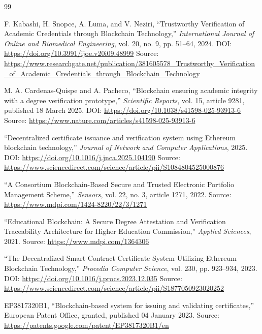 \documentclass[12pt,a4paper]{article}
\begin{document}
\newpage
\begin{thebibliography}{99}

F. Kabashi, H. Snopce, A. Luma, and V. Neziri,
\newblock ``Trustworthy Verification of Academic Credentials through Blockchain Technology,''
\newblock \emph{International Journal of Online and Biomedical Engineering}, vol. 20, no. 9, pp. 51--64, 2024.
\newblock DOI: \url{https://doi.org/10.3991/ijoe.v20i09.48999}
\newblock Source: \url{https://www.researchgate.net/publication/381605578_Trustworthy_Verification_of_Academic_Credentials_through_Blockchain_Technology}

M. A. Cardenas-Quispe and A. Pacheco,
\newblock ``Blockchain ensuring academic integrity with a degree verification prototype,''
\newblock \emph{Scientific Reports}, vol. 15, article 9281, published 18 March 2025.
\newblock DOI: \url{https://doi.org/10.1038/s41598-025-93913-6}
\newblock Source: \url{https://www.nature.com/articles/s41598-025-93913-6}

``Decentralized certificate issuance and verification system using Ethereum blockchain technology,''
\newblock \emph{Journal of Network and Computer Applications}, 2025.
\newblock DOI: \url{https://doi.org/10.1016/j.jnca.2025.104190}
\newblock Source: \url{https://www.sciencedirect.com/science/article/pii/S1084804525000876}

``A Consortium Blockchain-Based Secure and Trusted Electronic Portfolio Management Scheme,''
\newblock \emph{Sensors}, vol. 22, no. 3, article 1271, 2022.
\newblock Source: \url{https://www.mdpi.com/1424-8220/22/3/1271}

``Educational Blockchain: A Secure Degree Attestation and Verification Traceability Architecture for Higher Education Commission,''
\newblock \emph{Applied Sciences}, 2021.
\newblock Source: \url{https://www.mdpi.com/1364306}

``The Decentralized Smart Contract Certificate System Utilizing Ethereum Blockchain Technology,''
\newblock \emph{Procedia Computer Science}, vol. 230, pp. 923--934, 2023.
\newblock DOI: \url{https://doi.org/10.1016/j.procs.2023.12.035}
\newblock Source: \url{https://www.sciencedirect.com/science/article/pii/S1877050923020252}

EP3817320B1,
\newblock ``Blockchain-based system for issuing and validating certificates,''
\newblock European Patent Office, granted, published 04 January 2023.
\newblock Source: \url{https://patents.google.com/patent/EP3817320B1/en}


\end{thebibliography}
\end{document}
